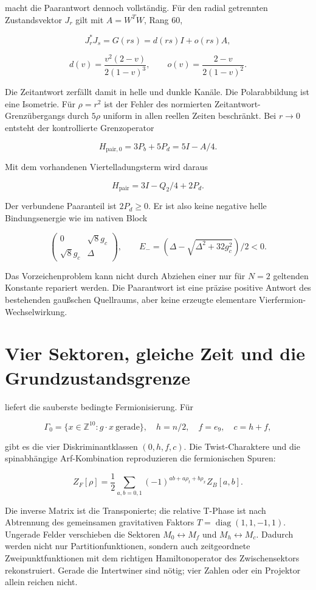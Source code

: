  macht die Paarantwort dennoch vollständig.
Für den radial getrennten Zustandsvektor \(J_r\) gilt mit \(A=W^TW\), Rang 60,

\[
 J_r^*J_s=G(rs)=d(rs)I+o(rs)A,
\]

\[
 d(v)=\frac{v^2(2-v)}{2(1-v)^3},\qquad
 o(v)=\frac{2-v}{2(1-v)^2}.
\]

Die Zeitantwort zerfällt damit in helle und dunkle Kanäle. Die Polarabbildung ist eine Isometrie. Für $\rho=r^2$ ist der Fehler des normierten Zeitantwort-Grenzübergangs durch $5\rho$ uniform in allen reellen Zeiten beschränkt. Bei \(r\to0\) entsteht der kontrollierte Grenzoperator

\[
 H_\mathrm{pair,0}=3P_b+5P_d=5I-A/4.
\]

Mit dem vorhandenen Viertelladungsterm wird daraus

\[
 H_\mathrm{pair}=3I-Q_2/4+2P_d.
\]

Der verbundene Paaranteil ist \(2P_d\ge0\). Er ist also keine negative helle
Bindungsenergie wie im nativen Block

\[
 \begin{pmatrix}0&\sqrt8g_c\\\sqrt8g_c&\Delta\end{pmatrix},\qquad
 E_-=(\Delta-\sqrt{\Delta^2+32g_c^2})/2<0.
\]

Das Vorzeichenproblem kann nicht durch Abziehen einer nur für $N=2$
geltenden Konstante repariert werden. Die Paarantwort ist eine präzise
positive Antwort des bestehenden gaußschen Quellraums, aber keine erzeugte
elementare Vierfermion-Wechselwirkung.

\section{Vier Sektoren, gleiche Zeit und die Grundzustandsgrenze}

 liefert die sauberste bedingte
Fermionisierung. Für

\[
 \Gamma_0=\{x\in\mathbb Z^{10}:g\cdot x\ \mathrm{gerade}\},
 \quad h=n/2,\quad f=e_9,\quad c=h+f,
\]

gibt es die vier Diskriminantklassen $(0,h,f,c)$. Die Twist-Charaktere und
die spinabhängige Arf-Kombination reproduzieren die fermionischen Spuren:

\[
 Z_F[\rho]=\frac12\sum_{a,b=0,1}
 (-1)^{ab+a\rho_t+b\rho_x}Z_B[a,b].
\]

Die inverse Matrix ist die Transponierte; die relative T-Phase ist nach
Abtrennung des gemeinsamen gravitativen Faktors \(T=\operatorname{diag}(1,1,-1,1)\).
Ungerade Felder verschieben die Sektoren \(M_0\leftrightarrow M_f\) und
\(M_h\leftrightarrow M_c\). Dadurch werden nicht nur Partitionfunktionen,
sondern auch zeitgeordnete Zweipunktfunktionen mit dem richtigen
Hamiltonoperator des Zwischensektors rekonstruiert. Gerade die Intertwiner sind nötig; vier
Zahlen oder ein Projektor allein reichen nicht.

